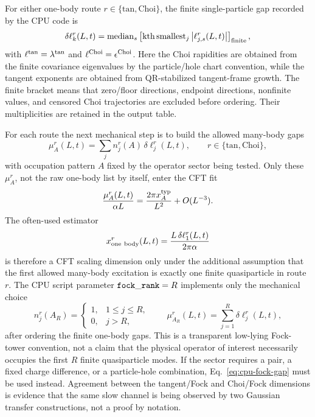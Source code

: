 \documentclass[aps,prb,onecolumn,nofootinbib,superscriptaddress]{revtex4-2}
\theoremstyle{plain}
\theoremstyle{definition}
\begin{document}
For either one-body route \(r\in\{\mathrm{tan},\mathrm{Choi}\}\), the finite
single-particle gap recorded by the CPU code is
\begin{equation}
  \delta\ell^{r}_{k}(L,t)
  =
  {\rm median}_{s}
  \left[
    {\rm kth\,smallest}_{j}\,
    \bigl|\ell^{r}_{j,s}(L,t)\bigr|
  \right]_{\rm finite},
  \label{eq:cpu-one-body-gap}
\end{equation}
with \(\ell^{\rm tan}=\lambda^{\rm tan}\) and
\(\ell^{\rm Choi}=\epsilon^{\rm Choi}\).  Here the Choi rapidities are obtained
from the finite covariance eigenvalues by the particle/hole chart convention,
while the tangent exponents are obtained from QR-stabilized tangent-frame
growth.
The finite bracket means that zero/floor directions, endpoint directions,
nonfinite values, and censored Choi trajectories are excluded before ordering.
Their multiplicities are retained in the output table.

For each route the next mechanical step is to build the allowed many-body gaps
\begin{equation}
  \mu_A^{r}(L,t)
  =
  \sum_j n_j^{r}(A)\,\delta\ell^{r}_{j}(L,t),
  \qquad
  r\in\{\mathrm{tan},\mathrm{Choi}\},
  \label{eq:cpu-fock-gap}
\end{equation}
with occupation pattern \(A\) fixed by the operator sector being tested.  Only
these \(\mu_A^r\), not the raw one-body list by itself, enter
the CFT fit
\begin{equation}
  \frac{\mu_A^{r}(L,t)}{\alpha L}
  =
  \frac{2\pi x_A^{\rm typ}}{L^2}
  +
  O(L^{-3}).
  \label{eq:cpu-fock-x-fit}
\end{equation}
The often-used estimator
\begin{equation}
  x_{\rm one\ body}^{r}(L,t)
  =
  \frac{L\,\delta\ell^{r}_{1}(L,t)}{2\pi\alpha}
  \label{eq:cpu-one-body-estimator}
\end{equation}
is therefore a CFT scaling dimension only under the additional assumption that
the first allowed many-body excitation is exactly one finite quasiparticle in
route \(r\).
The CPU script parameter \({\tt fock\_rank}=R\) implements only the mechanical
choice
\begin{equation}
  n_j^r(A_R)=
  \begin{cases}
    1, & 1\le j\le R,\\
    0, & j>R,
  \end{cases}
  \qquad
  \mu_{A_R}^{r}(L,t)=\sum_{j=1}^{R}\delta\ell_j^r(L,t),
  \label{eq:cpu-fock-rank-convention}
\end{equation}
after ordering the finite one-body gaps.  This is a transparent low-lying
Fock-tower convention, not a claim that the physical operator of interest
necessarily occupies the first \(R\) finite quasiparticle modes.
If the sector requires a pair, a fixed charge difference, or a particle-hole
combination, Eq.~\eqref{eq:cpu-fock-gap} must be used instead.  Agreement
between the tangent/Fock and Choi/Fock dimensions is evidence that the same
slow channel is being observed by two Gaussian transfer constructions, not a
proof by notation.
\end{document}
